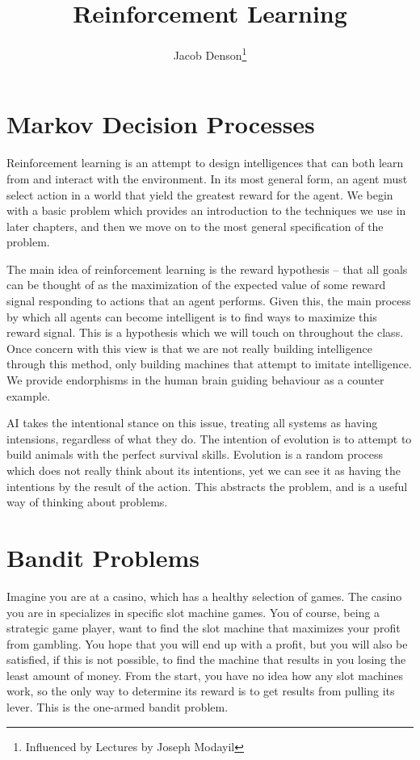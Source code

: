 \documentclass{report}
\title{Reinforcement Learning}
\author{Jacob Denson\thanks{Influenced by Lectures by Joseph Modayil}}
\begin{document}
\maketitle

\chapter{Markov Decision Processes}

Reinforcement learning is an attempt to design intelligences that can both learn from and interact with the environment. In its most general form, an agent must select action in a world that yield the greatest reward for the agent. We begin with a basic problem which provides an introduction to the techniques we use in later chapters, and then we move on to the most general specification of the problem.

The main idea of reinforcement learning is the reward hypothesis -- that all goals can be thought of as the maximization of the expected value of some reward signal responding to actions that an agent performs. Given this, the main process by which all agents can become intelligent is to find ways to maximize this reward signal. This is a hypothesis which we will touch on throughout the class. Once concern with this view is that we are not really building intelligence through this method, only building machines that attempt to imitate intelligence. We provide endorphisms in the human brain guiding behaviour as a counter example.

AI takes the intentional stance on this issue, treating all systems as having intensions, regardless of what they do. The intention of evolution is to attempt to build animals with the perfect survival skills. Evolution is a random process which does not really think about its intentions, yet we can see it as having the intentions by the result of the action. This abstracts the problem, and is a useful way of thinking about problems.

\chapter{Bandit Problems}

Imagine you are at a casino, which has a healthy selection of games. The casino you are in specializes in specific slot machine games. You of course, being a strategic game player, want to find the slot machine that maximizes your profit from gambling. You hope that you will end up with a profit, but you will also be satisfied, if this is not possible, to find the machine that results in you losing the least amount of money. From the start, you have no idea how any slot machines work, so the only way to determine its reward is to get results from pulling its lever. This is the one-armed bandit problem.
\end{document}
